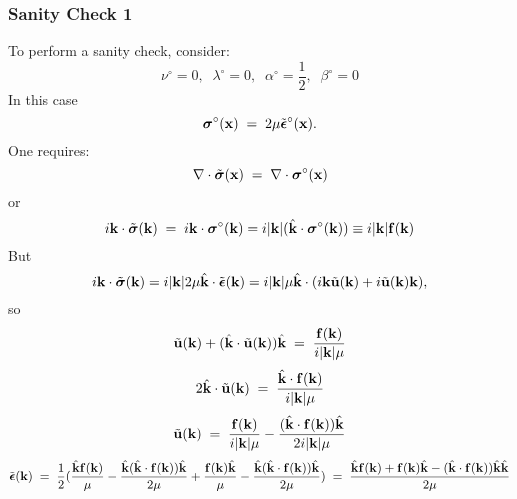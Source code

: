 \documentclass[12pt]{article}
\def\bmath#1{\mbox{\boldmath$#1$}}
\begin{document}
\subsubsection{Sanity Check 1}

To perform a sanity check, consider:
\begin{equation}
 \nu^\circ = 0, \;\; \lambda^\circ = 0, \;\; \alpha^\circ = \frac{1}{2}, \;\; \beta^\circ = 0
\end{equation}
In this case
\begin{equation}
 \bmath{\sigma}^\circ({\bf x}) \;=\; 2\mu \tilde{\bmath{\epsilon}}^\circ({\bf x}).
\end{equation}
One requires:
\begin{equation}
 \nabla\cdot \tilde{\bmath{\sigma}}({\bf x}) \;=\; 
 \nabla\cdot \bmath{\sigma}^\circ({\bf x})
\end{equation}
or
\begin{equation}
 i{\bf k}\cdot \tilde{\bmath{\sigma}}({\bf k}) \;=\; 
 i{\bf k}\cdot \bmath{\sigma}^\circ({\bf k}) = 
i|{\bf k}| (\hat{\bf k}\cdot \bmath{\sigma}^\circ({\bf k})) 
\equiv i|{\bf k}| {\bf f}({\bf k})
 \label{SanityCheck1StressEquilibriumEquation}
\end{equation}
But 
\begin{equation}
 i{\bf k}\cdot \tilde{\bmath{\sigma}}({\bf k}) = i|{\bf k}| 2\mu \hat{\bf k}\cdot \tilde{\bmath{\epsilon}}({\bf k}) 
= i|{\bf k}|\mu\hat{\bf k}\cdot (i{\bf k}\tilde{\bf u}({\bf k})+ i\tilde{\bf u}({\bf k}){\bf k}),
\end{equation}
so 
\begin{equation}
 \tilde{\bf u}({\bf k}) + (\hat{\bf k}\cdot\tilde{\bf u}({\bf k}))\hat{\bf k} 
 \;=\; \frac{{\bf f}({\bf k})}{i|{\bf k}|\mu}
\end{equation}
\begin{equation}
 2\hat{\bf k}\cdot\tilde{\bf u}({\bf k})
 \;=\; \frac{\hat{\bf k}\cdot{\bf f}({\bf k})}{i|{\bf k}|\mu}
\end{equation}
\begin{equation}
 \tilde{\bf u}({\bf k}) 
 \;=\; \frac{{\bf f}({\bf k})}{i|{\bf k}|\mu} - 
  \frac{(\hat{\bf k}\cdot{\bf f}({\bf k}))\hat{\bf k}}{2i|{\bf k}|\mu}
\end{equation}
\begin{equation}
 \tilde{\bmath{\epsilon}}({\bf k}) 
 \;=\; \frac{1}{2}( 
\frac{\hat{\bf k}{\bf f}({\bf k})}{\mu} - 
  \frac{\hat{\bf k}(\hat{\bf k}\cdot{\bf f}({\bf k}))\hat{\bf k}}{2\mu}
+ \frac{{\bf f}({\bf k})\hat{\bf k}}{\mu} - 
  \frac{\hat{\bf k}(\hat{\bf k}\cdot{\bf f}({\bf k}))\hat{\bf k}}{2\mu}
) \;=\; \frac{\hat{\bf k}{\bf f}({\bf k}) + {\bf f}({\bf k})\hat{\bf k}
- (\hat{\bf k}\cdot{\bf f}({\bf k}))\hat{\bf k}\hat{\bf k}}{2\mu}
\end{equation}
\end{document}
